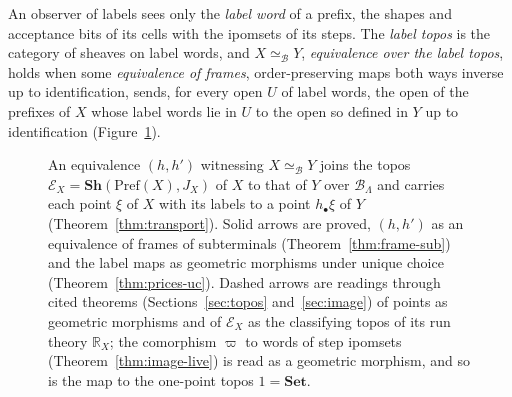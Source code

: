 \documentclass{lmcs}
\theoremstyle{definition}
\theoremstyle{remark}
\newcommand{\Ee}{\mathcal{E}}
\newcommand{\Sh}{\mathbf{Sh}}
\newcommand{\Set}{\mathbf{Set}}
\newcommand{\Clf}[1]{\Set[#1]}
\newcommand{\Pref}{\mathrm{Pref}}
\newcommand{\JX}[1]{J_{#1}}
\newcommand{\RX}[1]{\mathbb{R}_{#1}}
\providecommand{\BL}{\mathcal{B}_{\Lambda}}
\providecommand{\BST}{\mathcal{B}_{\mathrm{ST}}}
\providecommand{\fgt}{\varpi}
\providecommand{\eqB}{\simeq_{\mathcal{B}}}
\begin{document}
An observer of labels sees only the \emph{label word} of a prefix, the shapes and acceptance bits of its cells with
the ipomsets of its steps. The \emph{label topos} is the category of sheaves on label words, and $X\eqB Y$,
\emph{equivalence over the label topos}, holds when some \emph{equivalence of frames}, order-preserving maps both ways
inverse up to identification, sends, for every open $U$ of label words, the open of the prefixes of $X$ whose label
words lie in $U$ to the open so defined in $Y$ up to identification (Figure~\ref{fig:pattern}).

\begin{figure}[htb]
\centering
{}
\caption{An equivalence $(h,h')$ witnessing $X\eqB Y$ joins the topos $\Ee_X=\Sh(\Pref(X),\JX{X})$ of $X$ to that
of $Y$ over $\BL$ and carries each point $\xi$ of $X$ with its labels to a point $h_\bullet\xi$ of $Y$
(Theorem~\ref{thm:transport}). Solid arrows are proved, $(h,h')$ as an equivalence of frames of subterminals (Theorem~\ref{thm:frame-sub}) and the label maps as geometric morphisms under unique choice
(Theorem~\ref{thm:prices-uc}). Dashed arrows are readings through cited theorems (Sections~\ref{sec:topos} and~\ref{sec:image}) of points as
geometric morphisms and of $\Ee_X$ as the classifying topos of its run theory $\RX{X}$; the comorphism $\fgt$ to words of step ipomsets
(Theorem~\ref{thm:image-live}) is read as a geometric morphism, and so is the map to the one-point topos $1=\Set$.}
\label{fig:pattern}
\end{figure}
\end{document}
